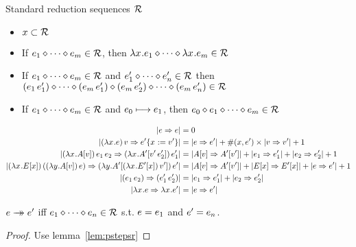 \documentclass{article}
\begin{document}
\begin{definition}[$\srseqop$]
Standard reduction sequences $\srseqset$
\begin{itemize}
\item $x \subset \srseqset$
\item If $\srseqe{m}$, then $\srseq{\lxe_1}{\lxe_m}$
\item If $\srseqe{m}$ and $\srseqe[']{n}$
      then $\srseqappend{(\ap{\e_1}{\e_1'})}{(\ap{\e_m}{\e_1'})}
            \srseq{(\ap{\e_m}{\e_2'})}{(\ap{\e_m}{\e_n'})}$
\item If $\srseqe{m}$ and $\e_0 \srstep \e_1$, then $\e_0 \srseqop \srseqe{m}$
\end{itemize}
\end{definition}

\begin{definition}
\begin{align*}
  \size{\e \pstep \e} &= 0 \\
  \size{\app{\lxe}{\val} \pstep \substx{\e'}{\val'}} 
    &= \size{\e \pstep \e'} + 
             \numfv{x}{\e'} \times \size{\val \pstep \val'} + 1 \\
  \size{\ap{\app{\lxAv}{\e_1}}{\e_2} \pstep 
        \app{\lx{\inA[']{\ap{\val'}{\e_2'}}}}{\e_1'}}
    &= \size{\Av \pstep \inA[']{\val'}} + 
       \size{\e_1 \pstep \e_1'} + \size{\e_2 \pstep \e_2'} + 1 \\
  \size{\appp{\lxEx}{\app{\lyAv}{\e}} \pstep 
        \app{\ly{\inA[']{\app{\lxEx[']}{\val'}}}}{\e'}}
    &= \size{\Av \pstep \inA[']{\val'}} + 
       \size{\Ex \pstep \Ex[']} + \size{\e \pstep \e'} + 1 \\
  \size{\apppp{e_1}{e_2} \pstep \apppp{\e_1'}{\e_2'}}
    &= \size{\e_1 \pstep \e_1'} + \size{\e_2 \pstep \e_2'} \\
  \size{\lxe \pstep \lxe'} &= \size{\e \pstep \e'}
\end{align*}
\end{definition}









\begin{theorem}
$\e \steps \e'$ iff $\srseqe{n}$ s.t. $\e = \e_1$ and $\e' = \e_n$.
\end{theorem}

\begin{proof}
Use lemma~\ref{lem:pstepsr}
\end{proof}
\end{document}
